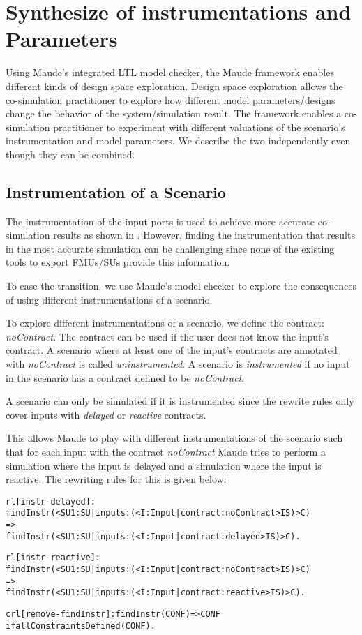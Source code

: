 
\section{Synthesize of instrumentations and Parameters}\label{sc:DSE}
Using Maude's integrated LTL model checker, the Maude framework enables different kinds of design space exploration.
Design space exploration allows the co-simulation practitioner to explore how different model parameters/designs change the behavior of the system/simulation result.
The framework enables a co-simulation practitioner to experiment with different valuations of the scenario's instrumentation and model parameters.
We describe the two independently even though they can be combined.


\subsection{Instrumentation of a Scenario}
The instrumentation of the input ports is used to achieve more accurate co-simulation results as shown in \cite{Gomes2019,Oakes2021,hansen_verification_2021}.
However, finding the instrumentation that results in the most accurate simulation can be challenging since none of the existing tools to export FMUs/SUs provide this information.

To ease the transition, we use Maude's model checker to explore the consequences of using different instrumentations of a scenario.

To explore different instrumentations of a scenario, we define the contract: \emph{noContract}.
The contract can be used if the user does not know the input's contract.
A scenario where at least one of the input's contracts are annotated with \emph{noContract} is called \emph{uninstrumented}.
A scenario is \emph{instrumented} if no input in the scenario has a contract defined to be \emph{noContract}.

A scenario can only be simulated if it is instrumented since the rewrite rules only cover inputs with \emph{delayed} or \emph{reactive} contracts.

This allows Maude to play with different instrumentations of the scenario such that for each input with the contract \textit{noContract} Maude tries to perform a simulation where the input is delayed and a simulation where the input is reactive.
The rewriting rules for this is given below:
\begin{alltt}
  \small
rl [instr-delayed]: 
findInstr(< SU1 : SU | inputs : (< I : Input | contract : noContract > IS) > C)
=>
findInstr(< SU1 : SU | inputs : (< I : Input | contract : delayed > IS) > C) .

rl [instr-reactive]: 
findInstr(< SU1 : SU | inputs : (< I : Input | contract : noContract > IS) > C)
=>
findInstr(< SU1 : SU | inputs : (< I : Input | contract : reactive > IS) > C) .

crl [remove-findInstr]: findInstr(CONF) => CONF 
  if allConstraintsDefined(CONF) .
\end{alltt}


